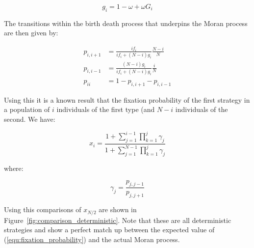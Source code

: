 \documentclass{article}
\begin{document}
{\begin{equation}\label{equ:expected_payoff_two}
    g_i = 1 - \omega + \omega G_i
\end{equation}

The transitions within the birth death process that underpins the Moran process
are then given by:

\begin{align}
	p_{i, i+1}&= \frac{if_i}{if_i+(N-i)g_i}\frac{N-i}{N}\label{equ:p_up}\\
	p_{i, i-1}&= \frac{(N-i)g_i}{if_i+(N-i)g_i}\frac{i}{N}\label{equ:p_down}\\
	p_{ii} &= 1 - p_{i, i+1} - p_{i, i-1}\label{equ:p_stay}
\end{align}

Using this it is a known result that the fixation probability of the first
strategy in a population of \(i\) individuals of the first type (and \(N-i\)
individuals of the second. We have:

\begin{equation}\label{equ:fixation_probability}
x_i = \frac{1 + \sum_{j=1}^{i-1}\prod_{k=1}^{j}\gamma_j}{1 + \sum_{j=1}^{N-1}\prod_{k=1}^{j}\gamma_j}
\end{equation}

where:

\[
\gamma_j = \frac{p_{j, j-1}}{p_{j, j+1}}
\]

Using this comparisons of \(x_{N/2}\) are shown in
Figure~\ref{fig:comparison_deterministic}. Note that these are all deterministic
strategies and show a perfect match up between the expected value of
(\ref{equ:fixation_probability}) and the actual Moran process.

}
\end{document}
